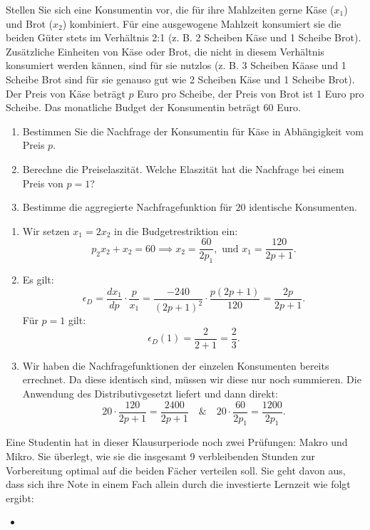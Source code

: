 \begin{question}[subtitle={Aggregierte Nachfrage, Elastizitäten und Konsumentenrente}]
	Stellen Sie sich eine Konsumentin vor, die  für ihre Mahlzeiten gerne Käse ($x_1$) und Brot ($x_2$) kombiniert.
	Für eine ausgewogene Mahlzeit konsumiert sie die beiden Güter stets im Verhältnis 2:1 (z. B. 2 Scheiben
	Käse und 1 Scheibe Brot). Zusätzliche Einheiten von Käse oder Brot, die nicht in diesem Verhältnis
	konsumiert werden kännen, sind für sie nutzlos (z. B. 3 Scheiben Käase und 1 Scheibe Brot sind für sie
	genauso gut wie 2 Scheiben Käse und 1 Scheibe Brot).
	Der Preis von Käse beträgt $p$ Euro pro Scheibe, der Preis von Brot ist 1 Euro pro Scheibe. Das
	monatliche Budget der Konsumentin beträgt 60 Euro.
	\begin{enumerate}
		\item Bestimmen Sie die Nachfrage der Konsumentin für Käse in Abhängigkeit vom Preis $p$.
		\item Berechne die Preiselaszität. Welche Elaszität hat die Nachfrage bei einem Preis von $p=1$?
		\item Bestimme die aggregierte Nachfragefunktion für $20$ identische Konsumenten.
	\end{enumerate}
\end{question}

\begin{solution}

	\begin{enumerate}
		\item Wir setzen $x_1 = 2x_2$ in die Budgetrestriktion ein:
		      \[
			      p_2x_2 + x_2 = 60 \implies x_2 = \frac{60}{2p_1}, \text{ und } x_1 = \frac{120}{2p+1}
			      .\]
		\item Es gilt:
		      \[
			      \epsilon_D = \frac{d x_1}{d p} \cdot \frac{p}{x_1} = \frac{-240}{(2p+1)^2} \cdot \frac{p(2p+1)}{120} = \frac{2p}{2p+1}
			      .\]
		      Für $p=1$ gilt:
		      \[
			      \epsilon_D(1) = \frac{2}{2+1} = \frac{2}{3}
			      .\]
		\item Wir haben die Nachfragefunktionen der einzelen Konsumenten bereits errechnet. Da diese identisch sind, müssen wir diese nur noch summieren.
		      Die Anwendung des Distributivgesetzt liefert und dann direkt:
		      \[
			      20 \cdot \frac{120}{2p+1} = \frac{2400}{2p+1}\quad \& \quad 20\cdot \frac{60}{2p_1} = \frac{1200}{2p_1}
			      .\]
	\end{enumerate}
\end{solution}

\begin{question}
	Eine Studentin hat in dieser Klausurperiode noch zwei Prüfungen: Makro und Mikro. Sie überlegt,
	wie sie die insgesamt 9 verbleibenden Stunden zur Vorbereitung optimal auf die beiden Fächer verteilen soll.
	Sie geht davon aus, dass sich ihre Note in einem Fach allein durch die investierte Lernzeit wie folgt
	ergibt:
	\begin{itemize}
		\item

	\end{itemize}
\end{question}


